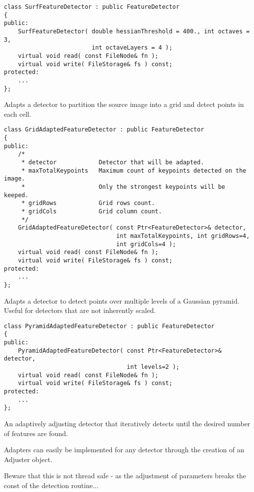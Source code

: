 \begin{lstlisting}
class SurfFeatureDetector : public FeatureDetector
{
public:
    SurfFeatureDetector( double hessianThreshold = 400., int octaves = 3,
                         int octaveLayers = 4 );
    virtual void read( const FileNode& fn );
    virtual void write( FileStorage& fs ) const;
protected:
    ...
};
\end{lstlisting}

Adapts a detector to partition the source image into a grid and detect 
points in each cell.

\begin{lstlisting}
class GridAdaptedFeatureDetector : public FeatureDetector
{
public:
    /*
     * detector            Detector that will be adapted.
     * maxTotalKeypoints   Maximum count of keypoints detected on the image. 
     *                     Only the strongest keypoints will be keeped.
     * gridRows            Grid rows count.
     * gridCols            Grid column count.
     */
    GridAdaptedFeatureDetector( const Ptr<FeatureDetector>& detector, 
                                int maxTotalKeypoints, int gridRows=4, 
                                int gridCols=4 );
    virtual void read( const FileNode& fn );
    virtual void write( FileStorage& fs ) const;
protected:
    ...
};
\end{lstlisting}

Adapts a detector to detect points over multiple levels of a Gaussian
pyramid. Useful for detectors that are not inherently scaled.

\begin{lstlisting}
class PyramidAdaptedFeatureDetector : public FeatureDetector
{
public:
    PyramidAdaptedFeatureDetector( const Ptr<FeatureDetector>& detector, 
                                   int levels=2 );
    virtual void read( const FileNode& fn );
    virtual void write( FileStorage& fs ) const;
protected:
    ...
};
\end{lstlisting}


An adaptively adjusting detector that iteratively detects until the desired number
of features are found.

Adapters can easily be implemented for any detector through the creation of an Adjuster
object.

Beware that this is not thread safe - as the adjustment of parameters breaks the const
of the detection routine...

